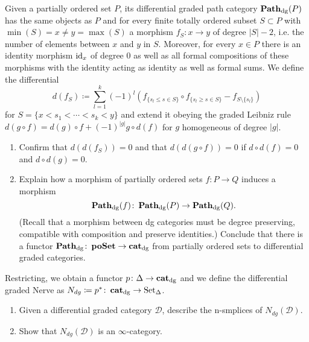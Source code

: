 \begin{Exercise}
	Given a partially ordered set $ P $, its differential graded path category $ \operatorname{\bold{Path}_{dg}} ( P ) $ has the same objects as $ P $ and for every finite totally ordered subset $ S \subset P $ with $ \min ( S ) = x \neq y = \max ( S ) $ a morphism $ f_S \colon x \to y $ of degree $ \lvert S \rvert - 2 $, i.e. the number of elements between $ x $ and $ y $ in $ S $.
	Moreover, for every $ x \in P $ there is an identity morphism $ \operatorname{id}_x $ of degree $ 0 $ as well as all formal compositions of these morphisms with the identity acting as identity as well as formal sums.
	We define the differential 
	\[
	d ( f_S ) \coloneqq \sum_{ l = 1 }^k ( - 1 )^l ( f_{ \{ s_l \leq s \in S \} } \circ f_{ \{ s_l \geq s \in S \} } - f_{ S \setminus \{ s_l \} } )
	\]
	for $ S = \{ x < s_1 < \dotsm < s_k < y \} $ and extend it obeying the graded Leibniz rule $ d ( g \circ f ) = d ( g ) \circ f + ( - 1 )^{ \lvert g \rvert } g \circ d ( f ) $ for $ g $ homogeneous of degree $ \lvert g \rvert $.
	\begin{enumerate}[label=(\alph*)]
		\item 
		Confirm that $ d ( d ( f_S ) ) = 0 $ and that $ d ( d ( g \circ f ) ) = 0 $ if $ d \circ d ( f ) = 0 $ and $ d \circ d ( g ) = 0 $.
		
		\item 
		Explain how a morphism of partially ordered sets $ f \colon P \to Q $ induces a morphism 
		\[
		\operatorname{\bold{Path}_{dg}} ( f ) \colon \operatorname{\bold{Path}_{dg}} ( P ) \to \operatorname{\bold{Path}_{dg}} ( Q ). 
		\]
		(Recall that a morphism between dg categories must be degree preserving, compatible with composition and preserve identities.)
		Conclude that there is a functor $ \operatorname{\bold{Path}_{dg}} \colon \operatorname{\bold{poSet}} \to \operatorname{\bold{cat}_{dg}} $ from partially ordered sets to differential graded categories.
	\end{enumerate}
	
	Restricting, we obtain a functor $ p \colon \Delta \to \operatorname{\bold{cat}_{dg}} $ and we define the differential graded Nerve as $ N_{dg} \coloneqq p^* \colon \operatorname{\bold{cat}_{dg}} \to \operatorname{Set}_{\Delta} $.
	
	\begin{enumerate}[resume, label=(\alph*)]
		\item 
		Given a differential graded category $ \mathcal{ D } $, describe the n-smplices of $ N_{dg} ( \mathcal{ D } ) $.
		
		\item 
		Show that $ N_{dg} ( \mathcal{ D } ) $ is an $ \infty $-category.
	\end{enumerate}
\end{Exercise}

